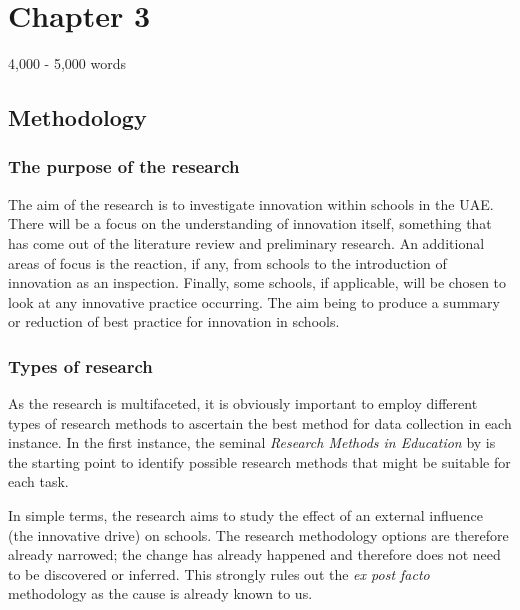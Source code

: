 \section{Chapter 3}
4,000 - 5,000 words
\subsection{Methodology}

\subsubsection{The purpose of the research}
The aim of the research is to investigate innovation within schools in the UAE. There will be a focus on the understanding of innovation itself, something that has come out of the literature review and preliminary research. An additional areas of focus is the reaction, if any, from schools to the introduction of innovation as an inspection. Finally, some schools, if applicable, will be chosen to look at any innovative practice occurring. The aim being to produce a summary or reduction of best practice for innovation in schools.

\subsubsection{Types of research}

As the research is multifaceted, it is obviously important to employ different types of research methods to ascertain the best method for data collection in each instance. In the first instance, the seminal \textit{Research Methods in Education} by \citet{Cohen2005} is the starting point to identify possible research methods that might be suitable for each task.

In simple terms, the research aims to study the effect of an external influence (the innovative drive) on schools. The research methodology options are therefore already narrowed; the change has already happened and therefore does not need to be discovered or inferred. This strongly rules out the \textit{ex post facto} methodology as the cause is already known to us.

